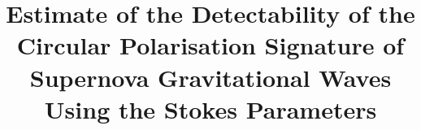 \documentclass[aps,twocolumn,showpacs,groupedaddress, nofootinbib]{revtex4}  %
\begin{document}
\widetext


\title{Estimate of the Detectability of the Circular Polarisation Signature of Supernova Gravitational Waves Using the Stokes Parameters}
 
\end{document}
